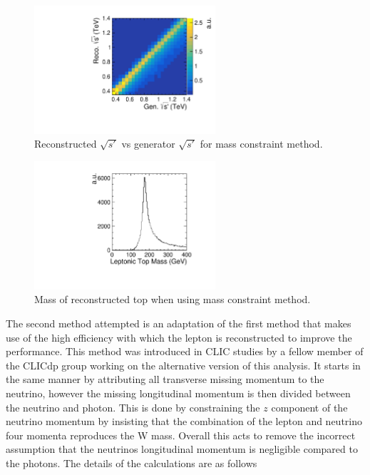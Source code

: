 \begin{figure}
  \centering
  \includegraphics[width=0.6\textwidth]{TopAnalysis/figures/AnalEVsTrueE.pdf}
  \caption[Reconstructed $\sqrt{s'}$ vs generator $\sqrt{s'}$ for mass constraint method]{Reconstructed $\sqrt{s'}$ vs generator $\sqrt{s'}$ for mass constraint method.}
  \label{fig:MassConstraint}
\end{figure}
\begin{figure}
  \centering
  \includegraphics[width=0.6\textwidth]{TopAnalysis/figures/AnalTopMass.pdf}
  \caption[Mass of reconstructed leptonic top when using mass constraint method]{Mass of reconstructed top when using mass constraint method.}
  \label{fig:TopMassFrommassMethod}
\end{figure}

The second method attempted is an adaptation of the first method that makes use of the high efficiency with which the lepton is reconstructed to improve the performance. This method was introduced in \ac{CLIC} studies by a fellow member of the CLICdp group working on the alternative version of this analysis\cite{TopPaperDraft}. It starts in the same manner by attributing all transverse missing momentum to the neutrino, however the missing longitudinal momentum is then divided between the neutrino and photon. This is done by constraining the $z$ component of the neutrino momentum by insisting that the combination of the lepton and neutrino four momenta reproduces the W mass. Overall this acts to remove the incorrect assumption that the neutrinos longitudinal momentum is negligible compared to the photons. The details of the calculations are as follows

